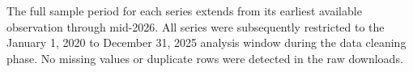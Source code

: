 The full sample period for each series extends from its earliest available observation through mid-2026. All series were subsequently restricted to the January 1, 2020 to December 31, 2025 analysis window during the data cleaning phase. No missing values or duplicate rows were detected in the raw downloads.
